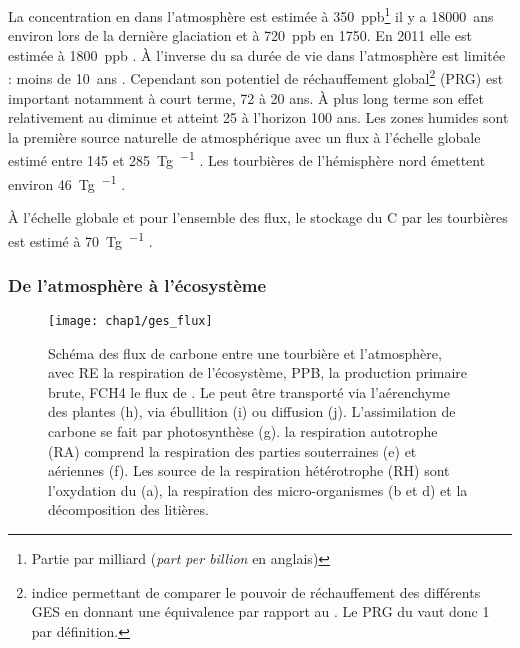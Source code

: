 La concentration en \chh dans l'atmosphère est estimée à \SI{350}{ppb}\footnote{Partie par milliard (\textit{part per billion} en anglais)} il y a \SI{18000}{ans} environ lors de la dernière glaciation et à \SI{720}{ppb} en 1750.
En 2011 elle est estimée à \SI{1800}{ppb} \citep{Ciais2014}.
À l'inverse du \coo sa durée de vie dans l'atmosphère est limitée : moins de \SI{10}{ans} \citep{lelieveld1998,prather2012}.
Cependant son potentiel de réchauffement global\footnote{indice permettant de comparer le pouvoir de réchauffement des différents GES en donnant une équivalence par rapport au \coo. Le PRG du \coo vaut donc 1 par définition.} (PRG) est important notamment à court terme, 72 à 20 ans.
À plus long terme son effet relativement au \coo diminue et atteint 25 à l'horizon 100 ans.
Les zones humides sont la première source naturelle de \chh atmosphérique avec un flux à l'échelle globale estimé entre \num{145} et \SI{285}{\tera\gram\per\year} \citep{lelieveld1998,wuebbles2002,Ciais2014}. %
Les tourbières de l'hémisphère nord émettent environ \SI{46}{\tera\gram\per\year} \citep{gorham1991}. %


À l'échelle globale et pour l'ensemble des flux, le stockage du C par les tourbières est estimé à \SI{70}{\tera\gram\per\year} \citep{clymo1998}.


\subsubsection{De l'atmosphère à l'écosystème}

\begin{figure}
\centering
\texttt{[image: chap1/ges\_flux]}
\caption{Schéma des flux de carbone entre une tourbière et l'atmosphère, avec RE la respiration de l'écosystème, PPB, la production primaire brute, FCH4 le flux de \chh. Le \chh peut être transporté via l'aérenchyme des plantes (h), via ébullition (i) ou diffusion (j). L'assimilation de carbone se fait par photosynthèse (g). la respiration autotrophe (RA) comprend la respiration des parties souterraines (e) et aériennes (f). Les source de la respiration hétérotrophe (RH) sont l'oxydation du \chh (a), la respiration des micro-organismes (b et d)  et la décomposition des litières.}
\label{fig:ges_flux}
\end{figure}


